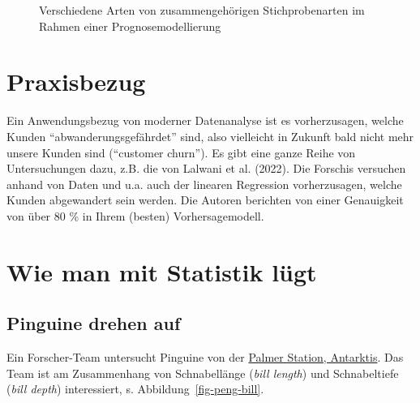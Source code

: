 \documentclass[
  letterpaper,
  twoside,
  open=any]{scrbook}
\theoremstyle{definition}
\theoremstyle{definition}
\theoremstyle{definition}
\theoremstyle{remark}
\begin{document}
\begin{figure}


\caption{\label{fig-sample-types}Verschiedene Arten von
zusammengehörigen Stichprobenarten im Rahmen einer Prognosemodellierung}

\end{figure}%

\section{Praxisbezug}\label{praxisbezug-4}

Ein Anwendungsbezug von moderner Datenanalyse ist es vorherzusagen,
welche Kunden \enquote{abwanderungsgefährdet} sind, also vielleicht in
Zukunft bald nicht mehr unsere Kunden sind (\enquote{customer churn}).
Es gibt eine ganze Reihe von Untersuchungen dazu, z.B. die von Lalwani
et al. (2022). Die Forschis versuchen anhand von Daten und u.a. auch der
linearen Regression vorherzusagen, welche Kunden abgewandert sein
werden. Die Autoren berichten von einer Genauigkeit von über 80 \% in
Ihrem (besten) Vorhersagemodell.

\section{Wie man mit Statistik
lügt}\label{wie-man-mit-statistik-luxfcgt-5}

\subsection{Pinguine drehen auf}\label{pinguine-drehen-auf}

Ein Forscher-Team untersucht Pinguine von der
\href{https://pallter.marine.rutgers.edu/}{Palmer Station, Antarktis}.
Das Team ist am Zusammenhang von Schnabellänge (\emph{bill length}) und
Schnabeltiefe (\emph{bill depth}) interessiert, s.
Abbildung~\ref{fig-peng-bill}.
\end{document}
